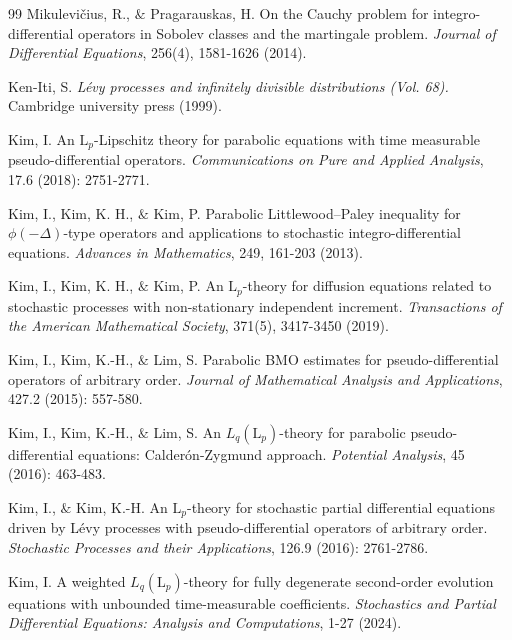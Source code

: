 \documentclass[11pt,reqno]{amsart}
\theoremstyle{definition}
\theoremstyle{remark}
\numberwithin{equation}{section}
\begin{document}
\begin{thebibliography}{99}
Mikulevičius, R., $\&$ Pragarauskas, H.  
On the Cauchy problem for integro-differential operators in Sobolev classes and the martingale problem. 
\textit{Journal of Differential Equations}, 
256(4), 1581-1626 (2014).



Ken-Iti, S.
\textit{Lévy processes and infinitely divisible distributions (Vol. 68).}
Cambridge university press (1999).



Kim, I. 
An $\mathrm{L}_p$-Lipschitz theory for parabolic equations with time measurable pseudo-differential operators. 
\textit{Communications on Pure and Applied Analysis},
17.6 (2018): 2751-2771.



Kim, I., Kim, K. H., $\&$ Kim, P. 
Parabolic Littlewood–Paley inequality for $\phi(-\Delta)$-type operators and applications to stochastic integro-differential equations. \textit{Advances in Mathematics}, 
249, 161-203 (2013). 



Kim, I., Kim, K. H., $\&$ Kim, P.  
An $\mathrm{L}_{p}$-theory for diffusion equations related to stochastic processes with non-stationary independent increment. \textit{Transactions of the American Mathematical Society},
371(5), 3417-3450 (2019).

Kim, I., Kim, K.-H., $\&$ Lim, S.
Parabolic BMO estimates for pseudo-differential operators of arbitrary order.
\textit{Journal of Mathematical Analysis and Applications},
427.2 (2015): 557-580.



Kim, I., Kim, K.-H., $\&$ Lim, S.
An $L_q(\mathrm{L}_p)$-theory for parabolic pseudo-differential equations: Calderón-Zygmund approach.
\textit{Potential Analysis},
 45 (2016): 463-483.


Kim, I., $\&$ Kim, K.-H. 
An $\mathrm{L}_p$-theory for stochastic partial differential equations driven by Lévy processes with pseudo-differential operators of arbitrary order.
\textit{Stochastic Processes and their Applications}, 
126.9 (2016): 2761-2786.


Kim, I. 
A weighted $L_q(\mathrm{L}_p)$-theory for fully degenerate second-order evolution equations with unbounded time-measurable coefficients. 
\textit{Stochastics and Partial Differential Equations: Analysis and Computations}, 1-27 (2024).



\end{thebibliography}
\end{document}
